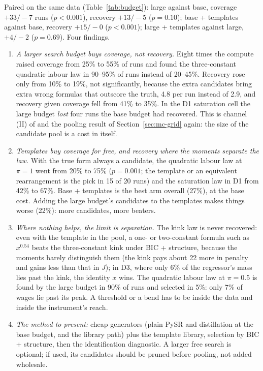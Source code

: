 Paired on the same data (Table~\ref{tab:budget}): large against base, coverage $+33/-7$ runs ($p < 0.001$), recovery $+13/-5$ ($p = 0.10$); base + templates against base, recovery $+15/-0$ ($p < 0.001$); large + templates against large, $+4/-2$ ($p = 0.69$). Four findings.

\begin{enumerate}
\item \emph{A larger search budget buys coverage, not recovery.} Eight times the compute raised coverage from 25\% to 55\% of runs and found the three-constant quadratic labour law in 90--95\% of runs instead of 20--45\%. Recovery rose only from 10\% to 19\%, not significantly, because the extra candidates bring extra wrong formulas that outscore the truth, 4.8 per run instead of 2.9, and recovery given coverage fell from 41\% to 35\%. In the D1 saturation cell the large budget \emph{lost} four runs the base budget had recovered. This is channel (II) of  and the pooling result of Section~\ref{sec:mc-grid} again: the size of the candidate pool is a cost in itself.
\item \emph{Templates buy coverage for free, and recovery where the moments separate the law.} With the true form always a candidate, the quadratic labour law at $\pi = 1$ went from 20\% to 75\% ($p = 0.001$; the template or an equivalent rearrangement is the pick in 15 of 20 runs) and the saturation law in D1 from 42\% to 67\%. Base + templates is the best arm overall (27\%), at the base cost. Adding the large budget's candidates to the templates makes things worse (22\%): more candidates, more beaters.
\item \emph{Where nothing helps, the limit is separation.} The kink law is never recovered: even with the template in the pool, a one- or two-constant formula such as $x^{0.54}$ beats the three-constant kink under BIC + structure, because the moments barely distinguish them (the kink pays about 22 more in penalty and gains less than that in $J$); in D3, where only 6\% of the regressor's mass lies past the kink, the identity $x$ wins. The quadratic labour law at $\pi = 0.5$ is found by the large budget in 90\% of runs and selected in 5\%: only 7\% of wages lie past its peak. A threshold or a bend has to be inside the data and inside the instrument's reach.
\item \emph{The method to present:} cheap generators (plain PySR and distillation at the base budget, and the library path) plus the template library, selection by BIC + structure, then the identification diagnostic. A larger free search is optional; if used, its candidates should be pruned before pooling, not added wholesale.
\end{enumerate}
